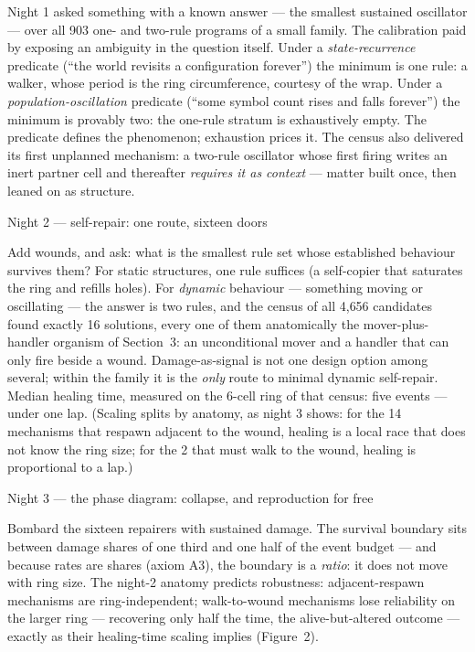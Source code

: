 Night 1 asked something with a known answer --- the smallest
sustained oscillator --- over all 903 one- and two-rule programs of
a small family. The calibration paid by exposing an ambiguity in
the question itself. Under a {\it state-recurrence} predicate
(“the world revisits a configuration forever”) the minimum is one
rule: a walker, whose period is the ring circumference, courtesy of
the wrap. Under a {\it population-oscillation} predicate (“some
symbol count rises and falls forever”) the minimum is provably
two: the one-rule stratum is exhaustively empty. The predicate
defines the phenomenon; exhaustion prices it. The census also
delivered its first unplanned mechanism: a two-rule oscillator
whose first firing writes an inert partner cell and thereafter
{\it requires it as context} --- matter built once, then leaned on
as structure.

\secc Night 2 --- self-repair: one route, sixteen doors

Add wounds, and ask: what is the smallest rule set whose
established behaviour survives them? For static structures, one
rule suffices (a self-copier that saturates the ring and refills
holes). For {\it dynamic} behaviour --- something moving or
oscillating --- the answer is two rules, and the census of all
4{,}656 candidates found exactly 16 solutions, every one of them
anatomically the mover-plus-handler organism of Section~3: an
unconditional mover and a handler that can only fire beside a
wound. Damage-as-signal is not one design option among several;
within the family it is the {\it only} route to minimal dynamic
self-repair. Median healing time, measured on the 6-cell ring of
that census: five events --- under one lap. (Scaling splits by
anatomy, as night 3 shows: for the 14 mechanisms that respawn
adjacent to the wound, healing is a local race that does not know
the ring size; for the 2 that must walk to the wound, healing is
proportional to a lap.)

\secc Night 3 --- the phase diagram: collapse, and reproduction for free

Bombard the sixteen repairers with sustained damage. The survival
boundary sits between damage shares of one third and one half of
the event budget --- and because rates are shares (axiom A3), the
boundary is a {\it ratio}: it does not move with ring size. The
night-2 anatomy predicts robustness: adjacent-respawn mechanisms
are ring-independent; walk-to-wound mechanisms lose reliability on
the larger ring --- recovering only half the time, the
alive-but-altered outcome --- exactly as their healing-time
scaling implies (Figure~2).

